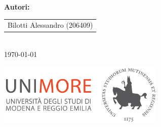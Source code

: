 \begin{titlepage}
    {\Large \textbf{\textcolor{tudelftdarkblue}{Autori:}}}\\[0.5cm]
    \begin{tabular}{c}
        \Large \textcolor{tudelftdarkblue}{Bilotti Alessandro (206409)}
    \end{tabular}\\[2cm]
    
    {\Large \textcolor{tudelftdarkblue}{\today}}
    
    \vfill
    \begin{center}
        \includegraphics[width=0.6\textwidth]{images/Logo_C_Positivo_Colore.png}
    \end{center}
\end{titlepage}